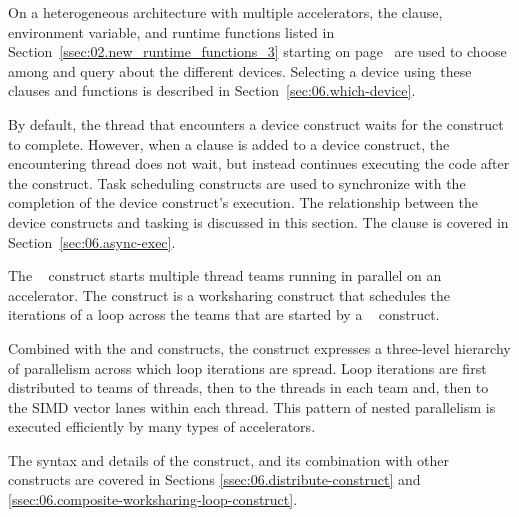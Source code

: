 On a heterogeneous architecture with
multiple accelerators, the  clause, 
environment variable, and runtime functions listed in 
Section~\ref{ssec:02.new_runtime_functions_3} starting on
page~\pageref{ssec:02.new_runtime_functions_3}  
are used to choose among and query about the different devices.  
Selecting a device using these clauses and functions is described in 
Section~\ref{sec:06.which-device}.

By default, the thread that encounters a device construct waits for the
construct to complete.  However, when a  clause is added to a
device construct, the encountering thread does not wait, but instead continues
executing the code after the construct.  Task scheduling constructs are
used to synchronize with the completion of the device construct's execution.
The relationship between the device constructs and tasking is discussed in
this section. The  clause is covered in Section~\ref{sec:06.async-exec}.


The ~ construct starts multiple thread teams running
in parallel on an accelerator.  The  construct is a
worksharing construct that schedules the iterations of a loop across the teams
that are started by a ~ construct.

Combined with the  and  constructs, the
 construct expresses a three-level hierarchy of parallelism
across which loop iterations are spread.  Loop iterations are first distributed
to teams of threads, then to the threads in each team and, then to the SIMD
vector lanes within each thread.  This pattern of nested parallelism is
executed efficiently by many types of accelerators.

The syntax and details of the  construct, and its combination
with other constructs are covered in Sections \ref{ssec:06.distribute-construct}
and \ref{ssec:06.composite-worksharing-loop-construct}.

